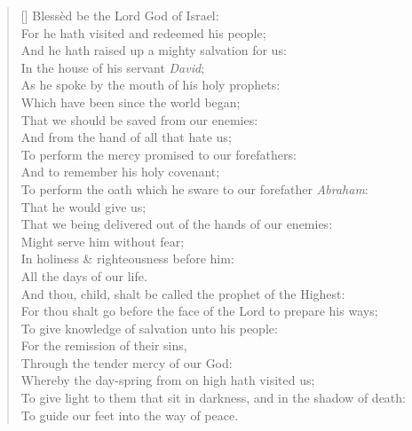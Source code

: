 \documentclass[MAIN]{subfiles}
\begin{document}
\settowidth{\versewidth}{\vin For he hath visited and redeemed his people;}
\begin{verse}[\versewidth]
Bless\`ed be the Lord God of Israel:\\
\vin For he hath visited and redeemed his people;\\
And he hath raised up a mighty salvation for us:\\
\vin In the house of his servant \emph{David};\\
As he spoke by the mouth of his holy prophets:\\
\vin Which have been since the world began;\\
That we should be saved from our enemies:\\
\vin And from the hand of all that hate us;\\
To perform the mercy promised to our forefathers:\\
\vin And to remember his holy covenant;\\
To perform the oath which he sware to our forefather \emph{Abraham}:\\
\vin That he would give us;\\
That we being delivered out of the hands of our enemies:\\
\vin Might serve him without fear;\\
In holiness \& righteousness before him:\\
\vin All the days of our life.\\
And thou, child, shalt be called the prophet of the Highest:\\
\vin For thou shalt go before the face of the Lord to prepare his ways;\\
To give knowledge of salvation unto his people:\\
\vin For the remission of their sins,\\
Through the tender mercy of our God:\\
\vin Whereby the day-spring from on high hath visited us;\\
To give light to them that sit in darkness, and in the shadow of death:\\
\vin To guide our feet into the way of peace.
\end{verse}
\end{document}
